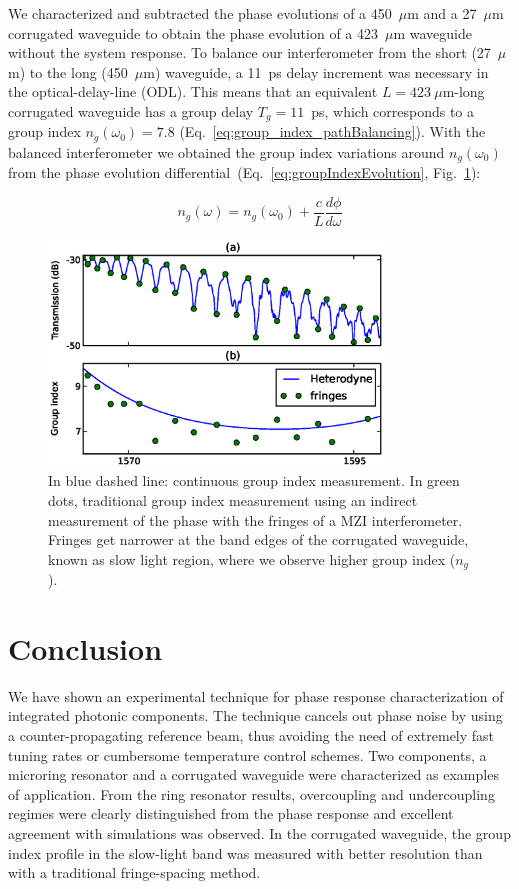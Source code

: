 \documentclass[journal]{IEEEtran}
\begin{document}
We characterized and subtracted the phase evolutions of a 450~$\mu$m and a 27~$\mu$m corrugated waveguide to obtain the phase evolution of a 423~$\mu$m waveguide without the system response. To balance our interferometer from the short (27~$\mu$m) to the long (450~$\mu$m) waveguide, a 11~ps delay increment was necessary in the optical-delay-line (ODL). This means that an equivalent $L=423~\mu$m-long corrugated waveguide has a group delay $T_g=11$~ps, which corresponds to a group index $n_g(\omega_0)=7.8$ (Eq.~\ref{eq:group_index_pathBalancing}). With the balanced interferometer  we obtained the group index variations around $n_g(\omega_0)$ from the phase evolution differential~(Eq.~\ref{eq:groupIndexEvolution}, Fig.~\ref{fig:groupIndex}):

\begin{equation}
  n_g (\omega)=  n_g(\omega_0) + \frac{c}{L} \frac{d\phi}{d\omega}
 \label{eq:groupIndexEvolution}
\end{equation}



\begin{figure}[htb]
  \centering
  \includegraphics[width=3.5in]{gropIndexComparison_2}
  \caption{In blue dashed line: continuous group index measurement. In green dots, traditional group index measurement using an indirect measurement of the phase with the fringes of a MZI interferometer. Fringes get narrower at the band edges of the corrugated waveguide, known as slow light region, where we observe higher group index ($n_g$).} 
  \label{fig:groupIndex}
\end{figure}



\section{Conclusion}
We have shown an experimental technique for phase response characterization of integrated photonic components. The technique cancels out phase noise by using a counter-propagating reference beam, thus avoiding the need of extremely fast tuning rates or cumbersome temperature control schemes. Two components, a microring resonator and a corrugated waveguide were characterized as examples of application. From the ring resonator results, overcoupling and undercoupling regimes were clearly distinguished from the phase response and excellent agreement with simulations was observed. In the corrugated waveguide, the group index profile in the slow-light band was measured with better resolution than with a traditional fringe-spacing method.
\end{document}
